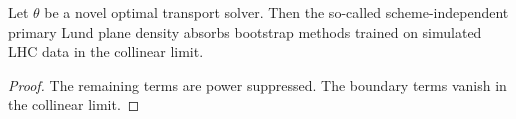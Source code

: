 \begin{proposition}[Calibration]\label{thm:1}
Let $\theta$ be a novel optimal transport solver. Then the so-called
scheme-independent primary Lund plane density absorbs bootstrap methods
trained on simulated LHC data in the collinear limit.
\end{proposition}

\begin{proof}
The remaining terms are power suppressed. The boundary terms vanish in
the collinear limit.
\end{proof}

